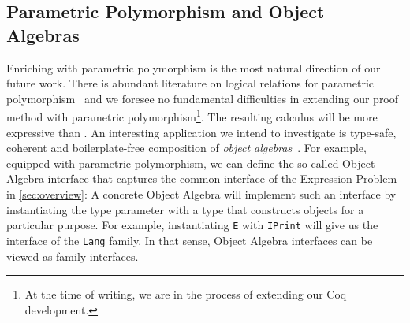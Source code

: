 \subsection{Parametric Polymorphism and Object Algebras}
Enriching \name with parametric polymorphism is the most natural direction of
our future work. There is abundant literature on logical relations for
parametric polymorphism~\citep{reynolds1983types} and we foresee no fundamental
difficulties in extending our proof method with parametric
polymorphism\footnote{At the time of writing, we are in the process of extending
  our Coq development.}. The resulting calculus will be more expressive than
\fname. An interesting application we intend to investigate is type-safe,
coherent and boilerplate-free composition of \textit{object
  algebras}~\citep{oliveira2012extensibility, oliveira2013feature}. For example,
equipped with parametric polymorphism, we can define the so-called Object
Algebra interface that captures the common interface of the Expression Problem in
\cref{sec:overview}:
A concrete Object Algebra will implement such an interface by instantiating the
type parameter with a type that constructs objects for a particular purpose. For
example, instantiating \lstinline{E} with \lstinline{IPrint} will give us the
interface of the \lstinline{Lang} family. In that sense, Object Algebra
interfaces can be viewed as family interfaces.






